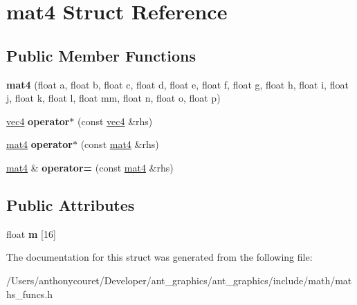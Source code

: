 \hypertarget{structmat4}{\section{mat4 Struct Reference}
\label{structmat4}
}
\subsection*{Public Member Functions}
\begin{DoxyCompactItemize}
\item 
\hypertarget{structmat4_aa23388c850e1826e266a640d914e6119}{{\bfseries mat4} (float a, float b, float c, float d, float e, float f, float g, float h, float i, float j, float k, float l, float mm, float n, float o, float p)}\label{structmat4_aa23388c850e1826e266a640d914e6119}

\item 
\hypertarget{structmat4_ad9b252b1e4b560445d77f839bb420348}{\hyperlink{structvec4}{vec4} {\bfseries operator$\ast$} (const \hyperlink{structvec4}{vec4} \&rhs)}\label{structmat4_ad9b252b1e4b560445d77f839bb420348}

\item 
\hypertarget{structmat4_a0714c730bc200119265535b40b980ee4}{\hyperlink{structmat4}{mat4} {\bfseries operator$\ast$} (const \hyperlink{structmat4}{mat4} \&rhs)}\label{structmat4_a0714c730bc200119265535b40b980ee4}

\item 
\hypertarget{structmat4_a46f9423bc631b42ea4df454e12177f87}{\hyperlink{structmat4}{mat4} \& {\bfseries operator=} (const \hyperlink{structmat4}{mat4} \&rhs)}\label{structmat4_a46f9423bc631b42ea4df454e12177f87}

\end{DoxyCompactItemize}
\subsection*{Public Attributes}
\begin{DoxyCompactItemize}
\item 
\hypertarget{structmat4_ab424bc8677a83f16bd30f4eaaecb6d3a}{float {\bfseries m} \mbox{[}16\mbox{]}}\label{structmat4_ab424bc8677a83f16bd30f4eaaecb6d3a}

\end{DoxyCompactItemize}


The documentation for this struct was generated from the following file\+:\begin{DoxyCompactItemize}
\item 
/\+Users/anthonycouret/\+Developer/ant\+\_\+graphics/ant\+\_\+graphics/include/math/maths\+\_\+funcs.\+h\end{DoxyCompactItemize}
